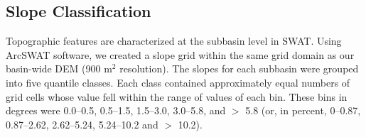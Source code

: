 \subsection{Slope Classification}\label{sec:slope}

Topographic features are characterized at the subbasin level in SWAT. 
Using ArcSWAT software, we created a slope grid within the same grid domain as our basin-wide DEM (900 m$^2$ resolution). 
The slopes for each subbasin were grouped into five quantile classes.
Each class contained approximately equal numbers of grid cells whose value fell within the range of values of each bin. 
These bins in degrees were 0.0--0.5, 0.5--1.5, 1.5--3.0, 3.0--5.8, and $>$ 5.8 
(or, in percent, 0--0.87, 0.87--2.62, 2.62--5.24, 5.24--10.2 and $>$ 10.2). 